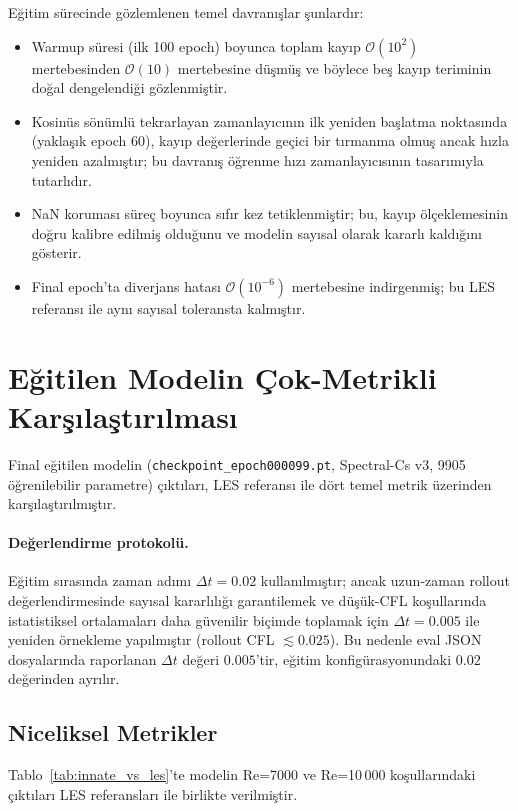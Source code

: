 Eğitim sürecinde gözlemlenen temel davranışlar şunlardır:

\begin{itemize}
  \item Warmup süresi (ilk 100 epoch) boyunca toplam kayıp $\mathcal{O}(10^{2})$ mertebesinden $\mathcal{O}(10)$ mertebesine düşmüş ve böylece beş kayıp teriminin doğal dengelendiği gözlenmiştir.
  \item Kosinüs sönümlü tekrarlayan zamanlayıcının ilk yeniden başlatma noktasında (yaklaşık epoch 60), kayıp değerlerinde geçici bir tırmanma olmuş ancak hızla yeniden azalmıştır; bu davranış öğrenme hızı zamanlayıcısının tasarımıyla tutarlıdır.
  \item NaN koruması süreç boyunca sıfır kez tetiklenmiştir; bu, kayıp ölçeklemesinin doğru kalibre edilmiş olduğunu ve modelin sayısal olarak kararlı kaldığını gösterir.
  \item Final epoch'ta diverjans hatası $\mathcal{O}(10^{-6})$ mertebesine indirgenmiş; bu LES referansı ile aynı sayısal toleransta kalmıştır.
\end{itemize}

\section{Eğitilen Modelin Çok-Metrikli Karşılaştırılması}
\label{sec:karsilastirma}

Final eğitilen modelin (\texttt{checkpoint\_epoch000099.pt}, Spectral-Cs v3, 9905 öğrenilebilir parametre) çıktıları, LES referansı ile dört temel metrik üzerinden karşılaştırılmıştır.

\paragraph{Değerlendirme protokolü.} Eğitim sırasında zaman adımı $\Delta t = 0.02$ kullanılmıştır; ancak uzun-zaman rollout değerlendirmesinde sayısal kararlılığı garantilemek ve düşük-CFL koşullarında istatistiksel ortalamaları daha güvenilir biçimde toplamak için $\Delta t = 0.005$ ile yeniden örnekleme yapılmıştır (rollout CFL $\lesssim 0.025$). Bu nedenle eval JSON dosyalarında raporlanan $\Delta t$ değeri $0.005$'tir, eğitim konfigürasyonundaki $0.02$ değerinden ayrılır.

\subsection{Niceliksel Metrikler}

Tablo~\ref{tab:innate_vs_les}'te modelin Re=7000 ve Re=10\,000 koşullarındaki çıktıları LES referansları ile birlikte verilmiştir.

